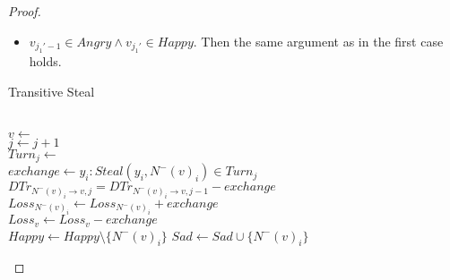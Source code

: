 \documentclass[11pt]{article}
\theoremstyle{definition}
\theoremstyle{corollary}
\theoremstyle{lemma}
\begin{document}
\begin{proof}
\begin{itemize}
\begin{itemize}
             \item $v_{j_1'-1} \in Angry \wedge v_{j_1'} \in Happy$. Then the same argument as in the first case holds.
          \end{itemize}
       \end{itemize}
       \begin{algorithm}[H]
          \label{transitivesteal}
          \caption{Transitive Steal}
          \Init{} \\
             {$v \gets$  \\
              $j \gets j + 1$ \\
              $Turn_j \gets$  \\
                 {$exchange \gets y_i : Steal(y_i, N^{-}(v)_i) \in Turn_j$ \\
                 $DTr_{N^{-}(v)_i \rightarrow v, j} = DTr_{N^{-}(v)_i \rightarrow v, j-1} - exchange$ \\
                 $Loss_{N^{-}(v)_i} \gets Loss_{N^{-}(v)_i} + exchange$ \\
                 $Loss_v \gets Loss_v - exchange$ \\
                    {$Happy \gets Happy \setminus \{N^{-}(v)_i\}$}
                    {$Sad \gets Sad \cup \{N^{-}(v)_i\}$}
                 }
}
\end{algorithm}
\end{proof}
\end{document}
